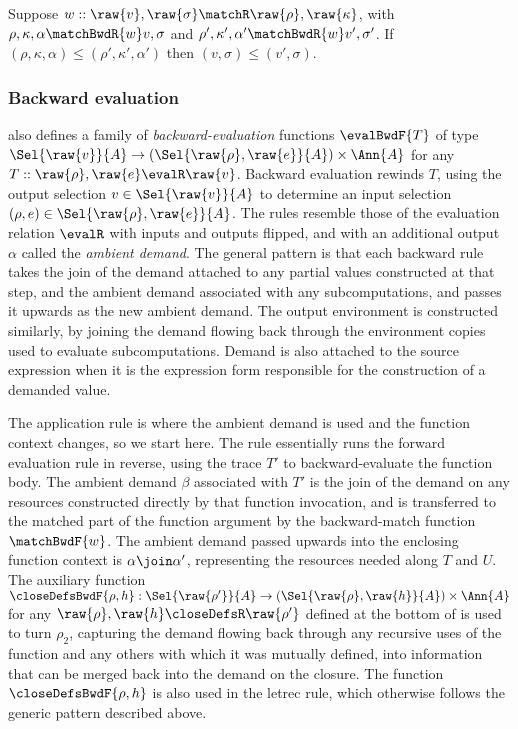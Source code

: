 \begin{lemma}
   Suppose $w :: \raw{v}, \raw{\sigma} \matchR \raw{\rho}, \raw{\kappa}$, with $\rho, \kappa, \alpha \matchBwdR{w} v, \sigma$ and $\rho', \kappa', \alpha' \matchBwdR{w} v', \sigma'$. If $(\rho, \kappa, \alpha) \leq (\rho', \kappa', \alpha')$ then $(v, \sigma) \leq (v', \sigma)$.
\end{lemma}

\subsubsection{Backward evaluation}
\label{sec:data-dependencies:analyses:bwd:eval}

 also defines a family of \emph{backward-evaluation} functions $\evalBwdF{T}$ of type $\Sel{\raw{v}}{A} \to (\Sel{\raw{\rho}, \raw{e}}{A}) \times \Ann{A}$ for any $T :: \raw{\rho}, \raw{e} \evalR \raw{v}$. Backward evaluation rewinds $T$, using the output selection $v \in \Sel{\raw{v}}{A}$ to determine an input selection $(\rho, e) \in \Sel{\raw{\rho}, \raw{e}}{A}$. The rules resemble those of the evaluation relation $\evalR$ with inputs and outputs flipped, and with an additional output $\alpha$ called the \emph{ambient demand}. The general pattern is that each backward rule takes the join of the demand attached to any partial values constructed at that step, and the ambient demand associated with any subcomputations, and passes it upwards as the new ambient demand. The output environment is constructed similarly, by joining the demand flowing back through the environment copies used to evaluate subcomputations. Demand is also attached to the source expression when it is the expression form responsible for the construction of a demanded value.

 The application rule is where the ambient demand is used and the function context changes, so we start here. The rule essentially runs the forward evaluation rule in reverse, using the trace $T'$ to backward-evaluate the function body. The ambient demand $\beta$ associated with $T'$ is the join of the demand on any resources constructed directly by that function invocation, and is transferred to the matched part of the function argument by the backward-match function $\matchBwdF{w}$. The ambient demand passed upwards into the enclosing function context is $\alpha \join \alpha'$, representing the resources needed along $T$ and $U$. The auxiliary function $\smash{\closeDefsBwdF{\rho, h}}: \smash{\Sel{\raw{\rho'}}{A} \to (\Sel{\raw{\rho}, \raw{h}}{A})} \times \Ann{A}$ for any $\raw{\rho}, \raw{h} \closeDefsR \raw{\rho'}$ defined at the bottom of  is used to turn $\rho_2$, capturing the demand flowing back through any recursive uses of the function and any others with which it was mutually defined, into information that can be merged back into the demand on the closure. The function $\closeDefsBwdF{\rho,h}$ is also used in the letrec rule, which otherwise follows the generic pattern described above.

